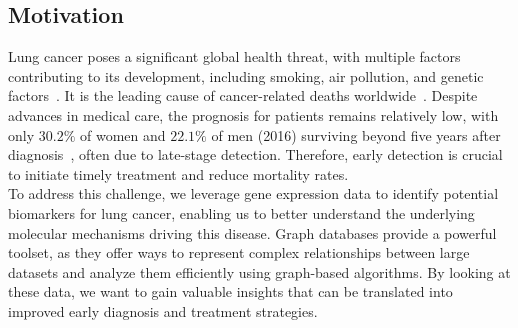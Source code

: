 \subsection{Motivation} \label{subsec:motivation}
Lung cancer poses a significant global health threat, with multiple factors contributing to its development,
including smoking, air pollution, and genetic factors~\cite{ferlay2024global}.
It is the leading cause of cancer-related deaths worldwide~\cite{ferlay2024global}.
Despite advances in medical care, the prognosis for patients remains relatively low,
with only $30.2\%$ of women and $22.1\%$ of men (2016) surviving beyond five years after diagnosis~\cite{seer2024explorer},
often due to late-stage detection.
Therefore, early detection is crucial to initiate timely treatment and reduce mortality rates.
\\

To address this challenge, we leverage gene expression data to identify potential biomarkers for lung cancer,
enabling us to better understand the underlying molecular mechanisms driving this disease.
Graph databases provide a powerful toolset, as they offer ways to represent complex relationships
between large datasets and analyze them efficiently using graph-based algorithms.
By looking at these data, we want to gain valuable insights that can be translated into improved early diagnosis and treatment strategies.